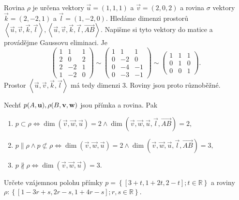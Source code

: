 \begin{reseni}
Rovina $\rho$ je určena vektory $\vec u = (1,1,1)$ a $\vec v = (2,0,2)$ a rovina $\sigma$ vektory
$\vec k=(2,-2,1)$ a $\vec l=(1,-2,0)$.
Hledáme dimenzi prostorů $\left<  \vec u, \vec v, \vec k, \vec l \right>, \left<  \vec u, \vec v, \vec k, \vec l, \overrightarrow{AB} \right> .$
Napišme si tyto vektory do matice a provádějme Gaussovu eliminaci. Je
$$
\begin{pmatrix}
	1 & 1 & 1 \\
	2 & 0 & 2 \\
	2 & -2 & 1 \\
	1 & -2 & 0
\end{pmatrix} \sim \begin{pmatrix}
	1 & 1 & 1 \\
	0 & -2 & 0 \\
	0 & -4 & -1 \\
	0 & -3 & -1
\end{pmatrix}\sim \begin{pmatrix}
    1 & 1 & 1 \\
	0 & 1 & 0 \\
	0 & 0 & 1
\end{pmatrix}.
$$
Prostor $\left<  \vec u, \vec v, \vec k, \vec l \right>$ má tedy dimenzi 3. Roviny jsou proto různoběžné.
\end{reseni}

\begin{veta}
    Nechť $p(A,\vec u),\linebreak \rho(B,\vec v, \vec w)$ jsou přímka a rovina. Pak
    \begin{enumerate}[$i.$]
    \item $p \subset \rho \iff \dim (\vec v, \vec w, \vec u) = 2 \land \dim (\vec v, \vec w, \vec u, \vec l, \overrightarrow{AB})=2,$
   	\item $p \parallel \rho \land p \not\subset \rho \iff \dim (\vec v, \vec w, \vec u) = 2 \land \dim (\vec v, \vec w, \vec u, \vec l, \overrightarrow{AB})=3,$
   	\item $p \nparallel \rho \iff \dim (\vec v, \vec w, \vec u) = 3$.
    \end{enumerate}
\end{veta}

\begin{priklad}
Určete vzájemnou polohu přímky $p=\left \{ [3+t,1+2t,2-t]; t \in \mathbb R \right \} $
a roviny $\rho\colon\left \{ [1-3r+s,2r-s,1+4r-s]; r,s\in \mathbb R \right \} .$
\end{priklad}


